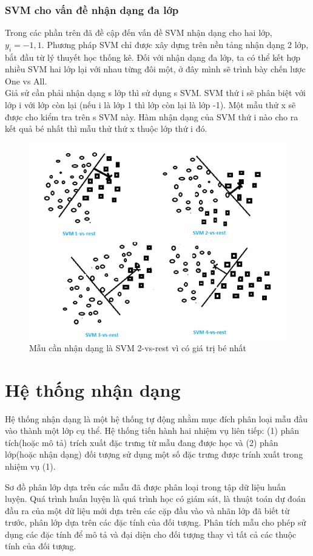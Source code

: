 \documentclass[12pt,a4paper]{article}
\begin{document}
\subsubsection{SVM cho vấn đề nhận dạng đa lớp}
Trong các phần trên đã đề cập đến vấn đề SVM nhận dạng cho hai lớp, $y_i= {-1,1}$. Phương pháp SVM chỉ được xây dựng trên nền tảng nhận dạng 2 lớp, bắt đầu từ lý thuyết học thống kê. Đối với nhận dạng đa lớp, ta có thể kết hợp nhiều SVM hai lớp lại với nhau từng đôi một, ở đây mình sẽ trình bày chến lược One vs All.\\
\indent Giả sử cần phải nhận dạng s lớp thì sử dụng s SVM. SVM thứ i sẽ phân biệt với lớp i với lớp còn lại (nếu i là lớp 1 thì lớp còn lại là lớp -1). Một mẫu thử x sẽ được cho kiểm tra trên s SVM này. Hàm nhận dạng của SVM thứ i nào cho ra kết quả bé nhất thì mẫu thử thứ x thuộc lớp thứ i đó.
\begin{figure}
    \centering
    \includegraphics[scale=0.7]{img/img7.png}
    \caption{Mẫu cần nhận dạng là SVM 2-vs-rest vì có giá trị bé nhất}
    \label{fig:my_label}
\end{figure}

\section{Hệ thống nhận dạng}
Hệ thống nhận dạng là một hệ thống tự động nhằm mục đích phân loại mẫu đầu vào thành một lớp cụ thể. Hệ thống tiến hành hai nhiệm vụ liên tiếp: (1) phân tích(hoặc mô tả) trích xuất đặc trưng từ mẫu đang được học và (2) phân lớp(hoặc nhận dạng) đối tượng sử dụng một số đặc trưng được trính xuất trong nhiệm vụ (1). \par 
Sơ đồ phân lớp dựa trên các mẫu đã được phân loại trong tập dữ liệu huấn luyện. Quá trình huấn luyện là quá trình học có giám sát, là thuật toán dự đoán đầu ra của một dữ liệu mới dựa trên các cặp đầu vào và nhãn lớp đã biết từ trước, phân lớp dựa trên các đặc tính của đối tượng. Phân tích mẫu cho phép sử dụng các đặc tính để mô tả và đại diện cho đối tượng thay vì tất cả các thuộc tính của đối tượng. \par 
\end{document}
